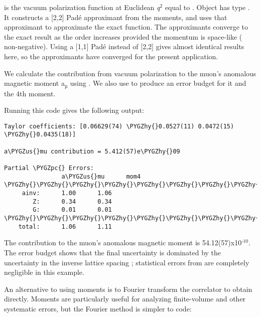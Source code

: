 \documentclass[letterpaper,10pt,english]{sphinxmanual}
\def\PYGZus{\char`\_}
\def\PYGZpc{\char`\%}
\def\PYGZhy{\char`\-}
\begin{document}
 is the vacuum polarization function at Euclidean \emph{q}$^{\text{2}}$
equal to . Object  has type {\hyperref[g2tools:g2tools.vacpol]{\emph{}}}. It
constructs a  {[}2,2{]} Padé approximant from the moments,
and uses that approximant to  approximate the exact function.
The approximants converge to the exact result as the order
increases provided the momentum is space-like ( non-negative).
Using a {[}1,1{]} Padé instead of {[}2,2{]} gives almost identical results here, so the
approximants have converged for the present application.

We calculate the contribution from vacuum polarization 
to the muon's anomalous magnetic moment a$_{\text{µ}}$ using
. We also use 
to produce an error budget for it and the 4th moment.

Running this code gives the following output:

\begin{Verbatim}[commandchars=\\\{\}]
Taylor coefficients: [0.06629(74) \PYGZhy{}0.0527(11) 0.0472(15) \PYGZhy{}0.0435(18)]

a\PYGZus{}mu contribution = 5.412(57)e\PYGZhy{}09

Partial \PYGZpc{} Errors:
                a\PYGZus{}mu      mom4
\PYGZhy{}\PYGZhy{}\PYGZhy{}\PYGZhy{}\PYGZhy{}\PYGZhy{}\PYGZhy{}\PYGZhy{}\PYGZhy{}\PYGZhy{}\PYGZhy{}\PYGZhy{}\PYGZhy{}\PYGZhy{}\PYGZhy{}\PYGZhy{}\PYGZhy{}\PYGZhy{}\PYGZhy{}\PYGZhy{}\PYGZhy{}\PYGZhy{}\PYGZhy{}\PYGZhy{}\PYGZhy{}\PYGZhy{}\PYGZhy{}\PYGZhy{}\PYGZhy{}\PYGZhy{}
     ainv:      1.00      1.06
        Z:      0.34      0.34
        G:      0.01      0.01
\PYGZhy{}\PYGZhy{}\PYGZhy{}\PYGZhy{}\PYGZhy{}\PYGZhy{}\PYGZhy{}\PYGZhy{}\PYGZhy{}\PYGZhy{}\PYGZhy{}\PYGZhy{}\PYGZhy{}\PYGZhy{}\PYGZhy{}\PYGZhy{}\PYGZhy{}\PYGZhy{}\PYGZhy{}\PYGZhy{}\PYGZhy{}\PYGZhy{}\PYGZhy{}\PYGZhy{}\PYGZhy{}\PYGZhy{}\PYGZhy{}\PYGZhy{}\PYGZhy{}\PYGZhy{}
    total:      1.06      1.11
\end{Verbatim}

The contribution to the muon's anomalous magnetic moment is
54.12(57)x10$^{\text{-10}}$. The error budget shows that the final
uncertainty is dominated by the uncertainty in the inverse
lattice spacing ; statistical errors from  are
completely negligible in this example.

An alternative to using moments is to Fourier transform the
correlator to obtain  directly. Moments are particularly
useful for analyzing finite-volume and other systematic errors, but
the Fourier method is simpler to code:
\end{document}
